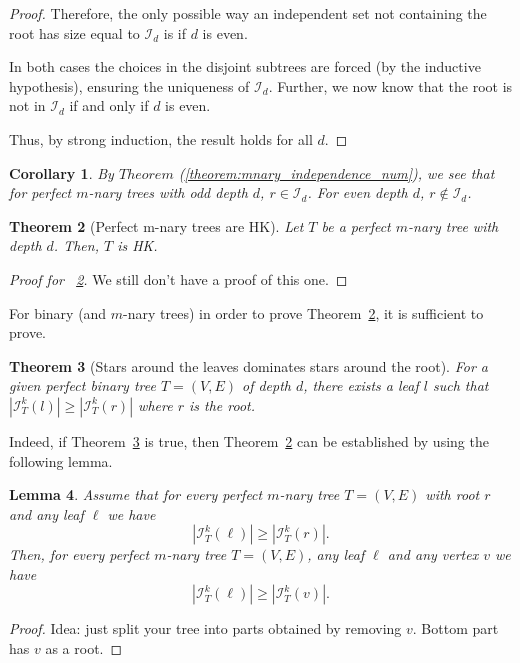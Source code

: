 \documentclass{amsart}
\newtheorem{theorem}{Theorem}[section]
\newtheorem{lemma}[theorem]{Lemma}
\newtheorem{corollary}[theorem]{Corollary}
\theoremstyle{definition}
\newcommand\II{{\mathcal I}}
\begin{document}
\begin{proof}
	Therefore, the only possible way an independent set not containing the root has size equal to $\II_d$ is if $d$ is even.

	\medskip

	In both cases the choices in the disjoint subtrees are forced (by the inductive hypothesis), ensuring the uniqueness of $\mathcal{I}_{d}$. Further, we now know that the root is not in $\mathcal{I}_{d}$ if and only if $d$ is even. 

	Thus, by strong induction, the result holds for all $d$.
\end{proof}


\begin{corollary}\label{cor:root_in_not_in}
	By $Theorem$ (\ref{theorem:mnary_independence_num}), we see that for perfect $m$-nary trees with odd depth $d$, $r \in \mathcal{I}_d$. For even depth $d$, $r \not\in \mathcal{I}_d$.
\end{corollary}


\begin{theorem}[Perfect m-nary trees are HK]\label{theorem:mnary_hk}
	Let $T$ be a perfect $m$-nary tree with depth $d$. Then, $T$ is HK.
\end{theorem}

\begin{proof}[Proof for ~\ref{theorem:mnary_hk}]
We still don't have a proof of this one.
\end{proof}


For binary (and $m$-nary trees) in order to prove Theorem~\ref{theorem:mnary_hk}, it is sufficient to prove.
\begin{theorem}[Stars around the leaves dominates stars around the root]\label{theorem:leaves_dom_root}
	For a given perfect binary tree $T = (V, E)$	of depth $d$, there exists a leaf $l$ such that $|\mathcal{I}^k_T(l)| \geq  |\mathcal{I}^k_T(r)|$ where $r$ is the root.
\end{theorem}

Indeed, if Theorem~\ref{theorem:leaves_dom_root} is true, then Theorem~\ref{theorem:mnary_hk} can be established by using the following lemma.

\begin{lemma}
    Assume that for every perfect $m$-nary  tree $T = (V, E)$ with root $r$ and any leaf $\ell$ we have $$|\mathcal{I}^k_T(\ell)| \geq  |\mathcal{I}^k_T(r)|.$$
    Then, for every perfect $m$-nary  tree $T = (V, E)$, any leaf $\ell$ and any vertex $v$ we have $$|\mathcal{I}^k_T(\ell)| \geq  |\mathcal{I}^k_T(v)|.$$
\end{lemma}
\begin{proof}
Idea: just split your tree into parts obtained by removing $v$. Bottom part has $v$ as a root. 
\end{proof}
\end{document}
